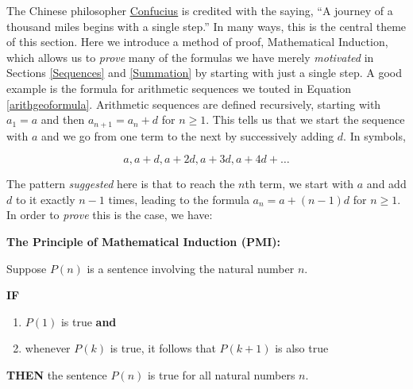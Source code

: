\documentclass{ximera}
\begin{document}
	\author{Stitz-Zeager}




\setcounter{footnote}{0}

\label{Induction}

The Chinese philosopher \href{http://en.wikipedia.org/wiki/Confucius}{\underline{Confucius}} is credited with the saying, ``A journey of a thousand miles begins with a single step.''  In many ways, this is the central theme of this section.  Here we introduce a method of proof, Mathematical Induction, which allows us to \textit{prove} many of the formulas we have merely \textit{motivated} in Sections \ref{Sequences} and \ref{Summation} by starting with just a single step.  A good example is the formula for arithmetic sequences we touted in Equation \ref{arithgeoformula}.  Arithmetic sequences are defined recursively, starting with $a_{1} = a$ and then $a_{n+1} = a_{n} + d$ for $n \geq 1$.  This tells us that we start the sequence with  $a$ and we go from one term to the next by successively adding $d$.  In symbols,

\[ a, a+d, a+2d, a + 3d, a + 4d +  \ldots\]

The pattern \textit{suggested} here is  that to reach the $n$th term, we start with $a$ and add $d$ to it exactly $n-1$ times, leading to the formula $a_{n} = a + (n-1)d$ for $n \geq 1$.  In order to  \textit{prove} this is the case, we have:

\smallskip


\label{PMI} \textbf{The Principle of Mathematical Induction (PMI):}  

Suppose $P(n)$ is a sentence involving the natural number $n$. 

\smallskip

\textbf{IF}

\begin{enumerate}

\item  $P(1)$ is true \textbf{and}

\item  whenever $P(k)$ is true, it follows that $P(k+1)$ is also true

\end{enumerate}

\textbf{THEN} the sentence $P(n)$ is true for all natural numbers $n$.
\end{document}
